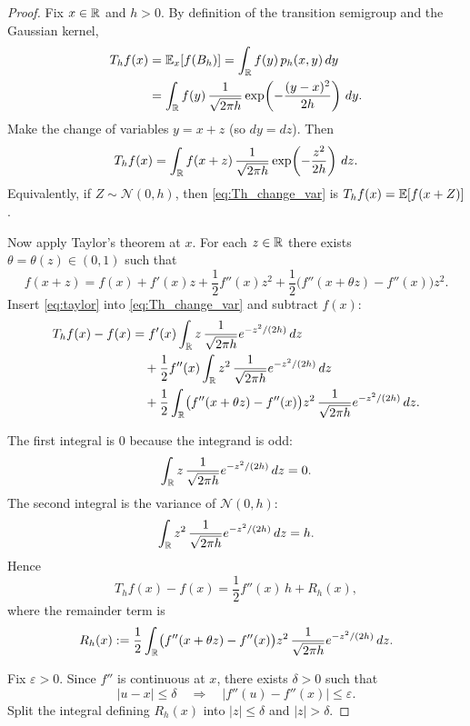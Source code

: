 \begin{proof}
Fix $x\in\mathbb{R}$ and $h>0$. By definition of the transition semigroup and the Gaussian kernel,
\begin{align*}
T_h f(x)
&=\mathbb{E}_x[f(B_h)]
=\int_{\mathbb{R}} f(y)\,p_h(x,y)\,dy\\
&=\int_{\mathbb{R}} f(y)\,\frac{1}{\sqrt{2\pi h}}
\exp\!\left(-\frac{(y-x)^2}{2h}\right)\,dy.
\end{align*}
Make the change of variables $y=x+z$ (so $dy=dz$). Then
\begin{equation}\label{eq:Th_change_var}
T_h f(x)
=\int_{\mathbb{R}} f(x+z)\,\frac{1}{\sqrt{2\pi h}}
\exp\!\left(-\frac{z^2}{2h}\right)\,dz.
\end{equation}
Equivalently, if $Z\sim\mathcal N(0,h)$, then \eqref{eq:Th_change_var} is $T_h f(x)=\mathbb{E}[f(x+Z)]$.

Now apply Taylor's theorem at $x$. For each $z\in\mathbb{R}$ there exists $\theta=\theta(z)\in(0,1)$ such that
\begin{equation}\label{eq:taylor}
f(x+z)
=
f(x)+f'(x)z+\frac12 f''(x)z^2
+
\frac12\bigl(f''(x+\theta z)-f''(x)\bigr)z^2.
\end{equation}
Insert \eqref{eq:taylor} into \eqref{eq:Th_change_var} and subtract $f(x)$:
\begin{align*}
T_h f(x)-f(x)
&=
f'(x)\int_{\mathbb{R}} z\,\frac{1}{\sqrt{2\pi h}}
e^{-z^2/(2h)}\,dz\\
&\quad+\frac12 f''(x)\int_{\mathbb{R}} z^2\,\frac{1}{\sqrt{2\pi h}}
e^{-z^2/(2h)}\,dz\\
&\quad+\frac12 \int_{\mathbb{R}}\bigl(f''(x+\theta z)-f''(x)\bigr)z^2\,
\frac{1}{\sqrt{2\pi h}}e^{-z^2/(2h)}\,dz.
\end{align*}

\medskip
{}
The first integral is $0$ because the integrand is odd:
\[
\int_{\mathbb{R}} z\,\frac{1}{\sqrt{2\pi h}}e^{-z^2/(2h)}\,dz=0.
\]
The second integral is the variance of $\mathcal N(0,h)$:
\[
\int_{\mathbb{R}} z^2\,\frac{1}{\sqrt{2\pi h}}e^{-z^2/(2h)}\,dz = h.
\]
Hence
\begin{equation}\label{eq:main_term}
T_h f(x)-f(x)=\frac12 f''(x)\,h + R_h(x),
\end{equation}
where the remainder term is
\[
R_h(x)
:=\frac12 \int_{\mathbb{R}}\bigl(f''(x+\theta z)-f''(x)\bigr)z^2\,
\frac{1}{\sqrt{2\pi h}}e^{-z^2/(2h)}\,dz.
\]

\medskip
{}
Fix $\varepsilon>0$. Since $f''$ is continuous at $x$, there exists $\delta>0$ such that
\[
|u-x|\le \delta \quad\Longrightarrow\quad |f''(u)-f''(x)|\le \varepsilon.
\]
Split the integral defining $R_h(x)$ into $|z|\le\delta$ and $|z|>\delta$.


\end{proof}
